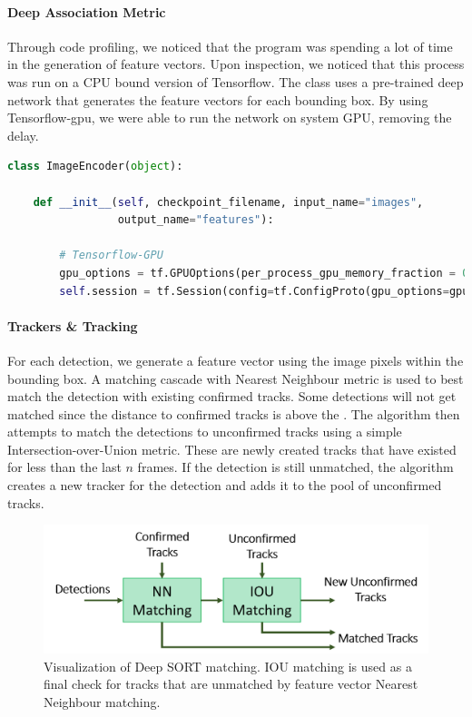 \paragraph{Deep Association Metric} Through code profiling, we noticed that the program was spending a lot of time in the generation of feature vectors. Upon inspection, we noticed that this process was run on a CPU bound version of Tensorflow. The  class uses a pre-trained deep network that generates the feature vectors for each bounding box. By using Tensorflow-gpu, we were able to run the network on system GPU, removing the delay. \\

\begin{lstlisting}[language=Python, caption={Deep SORT Tensorflow GPU modifications}]
class ImageEncoder(object):

	def __init__(self, checkpoint_filename, input_name="images",
				 output_name="features"):
				 
        # Tensorflow-GPU
        gpu_options = tf.GPUOptions(per_process_gpu_memory_fraction = 0.2)
        self.session = tf.Session(config=tf.ConfigProto(gpu_options=gpu_options))
\end{lstlisting}


\paragraph{Trackers \& Tracking} For each detection, we generate a feature vector using the image pixels within the bounding box. A matching cascade with Nearest Neighbour metric is used to best match the detection with existing confirmed tracks. Some detections will not get matched since the distance to confirmed tracks is above the . The algorithm then attempts to match the detections to unconfirmed tracks using a simple Intersection-over-Union metric. These are newly created tracks that have existed for less than the last $n$ frames. If the detection is still unmatched, the algorithm creates a new tracker for the detection and adds it to the pool of unconfirmed tracks.

\begin{figure}[ht]
	\centering
	\includegraphics[width=0.8\linewidth]{img/chapter5_implementation/deepSortMatching.png}
	\caption{Visualization of Deep SORT matching. IOU matching is used as a final check for tracks that are unmatched by feature vector Nearest Neighbour matching.}
	\label{fig:deepSortMatch}
\end{figure}

